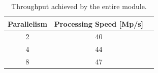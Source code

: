 \documentclass[conference,compsoc]{IEEEtran}
\begin{document}
\begin{table}[!t]
\renewcommand{\arraystretch}{1.3}
\caption{Throughput achieved by the entire module.}
\label{full_tp}
\centering
\begin{tabular}{|c|c|c|}
 \hline
  \textbf{Parallelism}  &    \textbf{Processing Speed [Mp/s]}  \\ \hline
          2             &                      40              \\ \hline
          4             &                      44              \\ \hline
          8             &                      47              \\ \hline
\end{tabular}           
\end{table}
%
%

\end{document}
